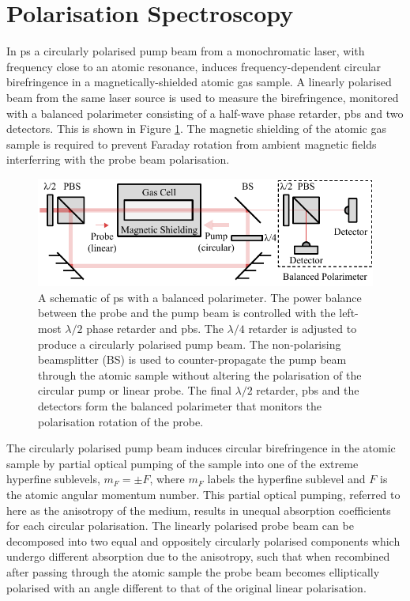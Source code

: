 \section{Polarisation Spectroscopy}%
\label{section:pol_spec_theory}

In \gls{ps} a circularly polarised pump beam from a monochromatic laser, with frequency close to an atomic resonance, induces frequency-dependent circular birefringence in a magnetically-shielded atomic gas sample.
A linearly polarised beam from the same laser source is used to measure the birefringence, monitored with a balanced polarimeter consisting of a half-wave phase retarder, \gls{pbs} and two detectors.
This is shown in Figure \ref{figure:pol_spec_schematic}.
The magnetic shielding of the atomic gas sample is required to prevent Faraday rotation from ambient magnetic fields interferring with the probe beam polarisation.

\begin{figure}
\centering
\includegraphics[width=\linewidth]{part1/Figs/PolSpecSchematic.pdf}
\caption{A schematic of \gls{ps} with a balanced polarimeter.
The power balance between the probe and the pump beam is controlled with the left-most $\lambda/2$ phase retarder and \gls{pbs}.
The $\lambda/4$ retarder is adjusted to produce a circularly polarised pump beam.
The non-polarising beamsplitter (BS) is used to counter-propagate the pump beam through the atomic sample without altering the polarisation of the circular pump or linear probe.
The final $\lambda/2$ retarder, \gls{pbs} and the detectors form the balanced polarimeter that monitors the polarisation rotation of the probe.}
\label{figure:pol_spec_schematic}
\end{figure}

The circularly polarised pump beam induces circular birefringence in the atomic sample by partial optical pumping of the sample into one of the extreme hyperfine sublevels, $m_F=\pm F$, where $m_F$ labels the hyperfine sublevel and $F$ is the atomic angular momentum number.
This partial optical pumping, referred to here as the anisotropy of the medium, results in unequal absorption coefficients for each circular polarisation.
The linearly polarised probe beam can be decomposed into two equal and oppositely circularly polarised components which undergo different absorption due to the anisotropy, such that when recombined after passing through the atomic sample the probe beam becomes elliptically polarised with an angle different to that of the original linear polarisation.

